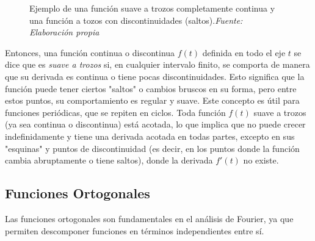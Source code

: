 \begin{figure}[H]
\begin{minipage}{0.5\textwidth}
	\end{minipage}
	\caption[Ejemplo de una función suave a trozos completamente continua y una función a tozos con discontinuidades (saltos).]{Ejemplo de una función suave a trozos completamente continua y una función a tozos con discontinuidades (saltos).\textit{Fuente: Elaboración propia}}
	\label{fig:funcion-suave-trozos}  %
\end{figure}
Entonces, una función continua o discontinua \( f(t) \) definida en todo el eje \( t \) se dice que es \textit{suave a trozos} si, en cualquier intervalo finito, se comporta de manera que su derivada es continua o tiene pocas discontinuidades. Esto significa que la función puede tener ciertos "saltos" o cambios bruscos en su forma, pero entre estos puntos, su comportamiento es regular y suave. Este concepto es útil para funciones periódicas, que se repiten en ciclos. Toda función \( f(t) \) suave a trozos (ya sea continua o discontinua) está acotada, lo que implica que no puede crecer indefinidamente y tiene una derivada acotada en todas partes, excepto en sus "esquinas" y puntos de discontinuidad (es decir, en los puntos donde la función cambia abruptamente o tiene saltos), donde la derivada \( f'(t) \) no existe. ~\cite{fourierTolstov}

\subsection{Funciones Ortogonales}
Las funciones ortogonales son fundamentales en el análisis de Fourier, ya que permiten descomponer funciones en términos independientes entre sí.

